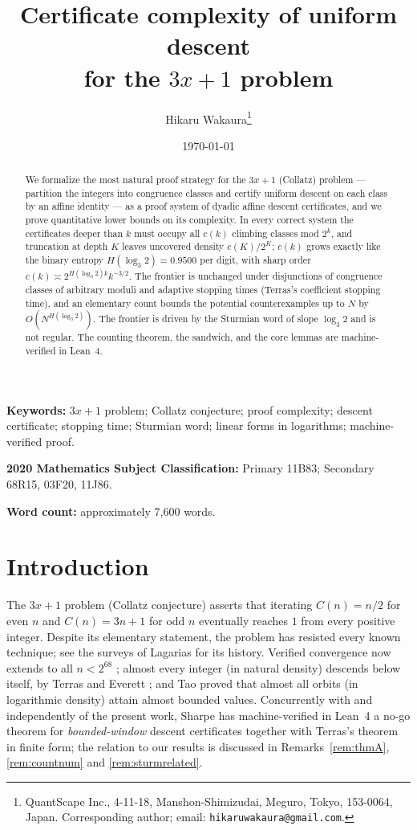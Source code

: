 \documentclass[11pt]{article}
\title{Certificate complexity of uniform descent\\ for the $3x+1$ problem}
\author{Hikaru Wakaura\thanks{QuantScape Inc., 4-11-18,
Manshon-Shimizudai, Meguro, Tokyo, 153-0064, Japan. Corresponding author;
email: \texttt{hikaruwakaura@gmail.com}. 
}}
\date{\today}
\theoremstyle{definition}
\begin{document}
\maketitle

\begin{abstract}
We formalize the most natural proof strategy for the $3x+1$ (Collatz)
problem --- partition the integers into congruence classes and certify
uniform descent on each class by an affine identity --- as a proof system
of dyadic affine descent certificates, and we prove quantitative lower
bounds on its complexity. In every correct system the certificates deeper
than $k$ must occupy all $c(k)$ climbing classes mod $2^k$, and truncation
at depth $K$ leaves uncovered density $c(K)/2^K$; $c(k)$ grows exactly like
the binary entropy $H(\log_3 2)=0.9500$ per digit, with sharp order
$c(k)\asymp 2^{H(\log_3 2)k}k^{-3/2}$. The frontier is unchanged under disjunctions of
congruence classes of arbitrary moduli and adaptive stopping times
(Terras's coefficient stopping time), and an elementary count bounds the
potential counterexamples up to $N$ by $O(N^{H(\log_3 2)})$. The frontier
is driven by the Sturmian word of slope $\log_3 2$ and is not regular.
The counting theorem, the sandwich, and the core lemmas are
machine-verified in Lean~4.
\end{abstract}
 
\noindent\textbf{Keywords:} $3x+1$ problem; Collatz conjecture; proof
complexity; descent certificate; stopping time; Sturmian word; linear
forms in logarithms; machine-verified proof.
 
\noindent\textbf{2020 Mathematics Subject Classification:} Primary 11B83;
Secondary 68R15, 03F20, 11J86.

\noindent\textbf{Word count:} approximately 7{,}600 words.

\section{Introduction}\label{sec:intro}

The $3x+1$ problem (Collatz conjecture) asserts that iterating
$C(n)=n/2$ for even $n$ and $C(n)=3n+1$ for odd $n$ eventually reaches $1$
from every positive integer. Despite its elementary statement, the problem
has resisted every known technique; see the surveys of Lagarias
\cite{Lagarias1985,Lagarias2010} for its history. Verified convergence now
extends to all $n<2^{68}$ \cite{Barina2021}; almost every integer (in
natural density) descends below itself, by Terras \cite{Terras1976} and
Everett \cite{Everett1977}; and Tao \cite{Tao2022} proved that almost all orbits (in logarithmic
density) attain almost bounded values. Concurrently with and independently
of the present work, Sharpe \cite{Sharpe2026} has machine-verified in
Lean~4 a no-go theorem for \emph{bounded-window} descent certificates
together with Terras's theorem in finite form; the relation to our
results is discussed in Remarks~\ref{rem:thmA}, \ref{rem:countnum} and
\ref{rem:sturmrelated}.
\end{document}

